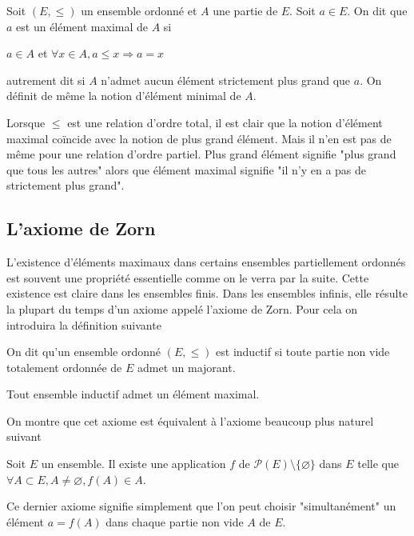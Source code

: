 \begin{de}
Soit $(E,\leqslant)$ un ensemble ordonné et $A$ une partie de $E$.
Soit $a \in E$. On dit que $a$ est un élément maximal de $A$ si

$a \in A$ et $\forall x \in A, a \leqslant x \Rightarrow a = x$

autrement dit si $A$ n'admet aucun élément strictement plus grand que $a$.
On définit de même la notion d'élément minimal de $A$.
\end{de}

\begin{rem}
Lorsque $\leqslant$ est une relation d'ordre total, il est clair
que la notion d'élément maximal coïncide avec la notion de plus grand
élément. Mais il n'en est pas de même pour une relation d'ordre partiel.
Plus grand élément signifie "plus grand que tous les autres" alors que
élément maximal signifie "il n'y en a pas de strictement plus grand".
\end{rem}

\subsection{L'axiome de Zorn}

L'existence d'éléments maximaux dans certains ensembles partiellement
ordonnés est souvent une propriété essentielle comme on le verra par la
suite. Cette existence est claire dans les ensembles finis. Dans les
ensembles infinis, elle résulte la plupart du temps d'un axiome appelé
l'axiome de Zorn. Pour cela on introduira la définition suivante

\begin{de}
On dit qu'un ensemble ordonné $(E,\leqslant)$ est inductif si
toute partie non vide totalement ordonnée de $E$ admet un majorant.
\end{de}

\begin{thm}[Zorn]
Tout ensemble inductif admet un élément maximal.
\end{thm}

\begin{rem}
On montre que cet axiome est équivalent à l'axiome
beaucoup plus naturel suivant
\end{rem}

\begin{thm}
Soit $E$ un ensemble. Il existe une
application $f$ de $\mathscr{P}(E) \setminus \{\varnothing\}$ dans $E$
telle que $\forall A \subset E, A \neq \varnothing, f(A) \in A$.
\end{thm}

\begin{rem}
Ce dernier axiome signifie simplement que l'on peut
choisir "simultanément" un élément $a = f(A)$ dans chaque partie non
vide $A$ de $E$.
\end{rem}